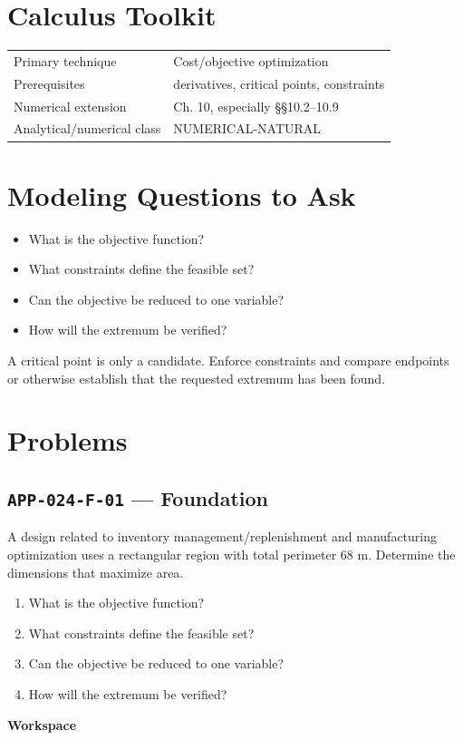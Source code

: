 \documentclass[11pt]{book}
\newcommand{\pid}[1]{\texttt{#1}}
\newcommand{\workspace}{\par\vspace{0.7in}\hrulefill\par\vspace{0.55in}\hrulefill\par}
\begin{document}
\section*{Calculus Toolkit}
\begin{tabularx}{\textwidth}{@{}lX@{}}\toprule
Primary technique & Cost/objective optimization \\
Prerequisites & derivatives, critical points, constraints \\
Numerical extension & Ch. 10, especially §§10.2–10.9 \\
Analytical/numerical class & NUMERICAL-NATURAL \\
\bottomrule\end{tabularx}
\section*{Modeling Questions to Ask}\begin{itemize}
\item What is the objective function?
\item What constraints define the feasible set?
\item Can the objective be reduced to one variable?
\item How will the extremum be verified?
\end{itemize}
\begin{errorbox}A critical point is only a candidate. Enforce constraints and compare endpoints or otherwise establish that the requested extremum has been found.\end{errorbox}
\section*{Problems}
\subsection*{\pid{APP-024-F-01} — Foundation}
\begin{problembox}
A design related to inventory management/replenishment and manufacturing optimization uses a rectangular region with total perimeter 68 m. Determine the dimensions that maximize area.
\end{problembox}
\begin{promptbox}\begin{enumerate}
\item What is the objective function?
\item What constraints define the feasible set?
\item Can the objective be reduced to one variable?
\item How will the extremum be verified?
\end{enumerate}\end{promptbox}
\textbf{Workspace}\workspace
{}
\end{document}
